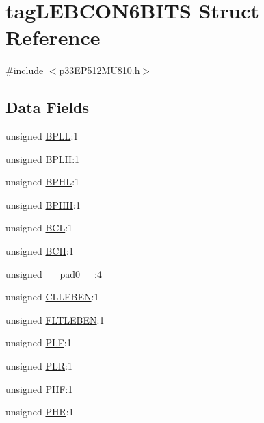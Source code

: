 \hypertarget{structtag_l_e_b_c_o_n6_b_i_t_s}{}\section{tag\+L\+E\+B\+C\+O\+N6\+B\+I\+TS Struct Reference}
\label{structtag_l_e_b_c_o_n6_b_i_t_s}


{\ttfamily \#include $<$p33\+E\+P512\+M\+U810.\+h$>$}

\subsection*{Data Fields}
\begin{DoxyCompactItemize}
\item 
unsigned \hyperlink{structtag_l_e_b_c_o_n6_b_i_t_s_a734b807d032fa494468c04783b84279d}{B\+P\+LL}\+:1
\item 
unsigned \hyperlink{structtag_l_e_b_c_o_n6_b_i_t_s_ab92bd28ed3161199870cae9dca9d8264}{B\+P\+LH}\+:1
\item 
unsigned \hyperlink{structtag_l_e_b_c_o_n6_b_i_t_s_ab1b78e048d280a836358a465b1670e7a}{B\+P\+HL}\+:1
\item 
unsigned \hyperlink{structtag_l_e_b_c_o_n6_b_i_t_s_a8fd804263987e931f779f124751138e1}{B\+P\+HH}\+:1
\item 
unsigned \hyperlink{structtag_l_e_b_c_o_n6_b_i_t_s_acead45594aa9d4a55a37f37fdcc3f0a0}{B\+CL}\+:1
\item 
unsigned \hyperlink{structtag_l_e_b_c_o_n6_b_i_t_s_a485d688549b456635ec3ac860ad7cdaf}{B\+CH}\+:1
\item 
unsigned \hyperlink{structtag_l_e_b_c_o_n6_b_i_t_s_adf71f3d8410c1f1dbbc96680a92c49af}{\+\_\+\+\_\+pad0\+\_\+\+\_\+}\+:4
\item 
unsigned \hyperlink{structtag_l_e_b_c_o_n6_b_i_t_s_a4ec62ac7ec38a6cf1ca2276db69912a9}{C\+L\+L\+E\+B\+EN}\+:1
\item 
unsigned \hyperlink{structtag_l_e_b_c_o_n6_b_i_t_s_aa96ca2430a7a6200927f390d1aa0b21a}{F\+L\+T\+L\+E\+B\+EN}\+:1
\item 
unsigned \hyperlink{structtag_l_e_b_c_o_n6_b_i_t_s_ab72be8b35e01107182afb8e9733d72bb}{P\+LF}\+:1
\item 
unsigned \hyperlink{structtag_l_e_b_c_o_n6_b_i_t_s_a5f690459b53fc81b46dbbac226cecb25}{P\+LR}\+:1
\item 
unsigned \hyperlink{structtag_l_e_b_c_o_n6_b_i_t_s_a4ac425e6c1575269dfa33a0373584fff}{P\+HF}\+:1
\item 
unsigned \hyperlink{structtag_l_e_b_c_o_n6_b_i_t_s_ae02a9c6926c3a1feac21cec18a520e4a}{P\+HR}\+:1
\end{DoxyCompactItemize}


